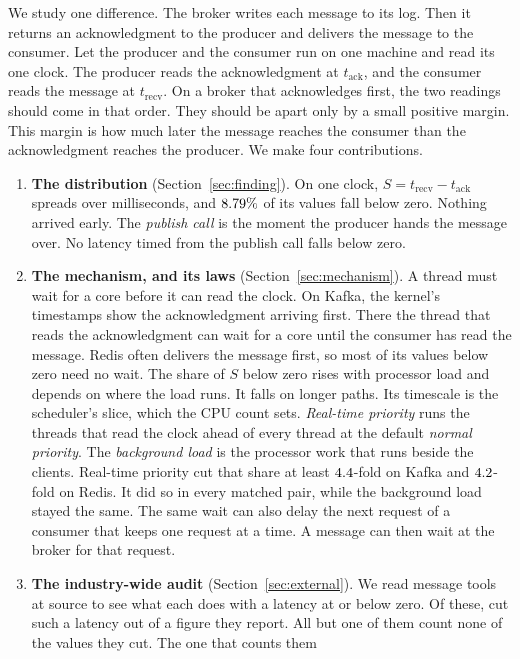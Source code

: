 \documentclass[10pt,journal,compsoc]{IEEEtran}
\newcommand{\kafka}{Kafka}
\newcommand{\redis}{Redis}
\begin{document}
We study one difference. The broker writes each message to its log. Then it returns an
acknowledgment to the producer and delivers the message to the consumer. Let the producer and the
consumer run on one machine and read its one clock. The producer reads the acknowledgment at
$t_{\mathrm{ack}}$, and the consumer reads the message at $t_{\mathrm{recv}}$. On a broker that
acknowledges first, the two readings should come in that order. They should be apart only by a
small positive margin. This margin is how much later the message reaches the consumer than the
acknowledgment reaches the producer.
We make four contributions.
\begin{enumerate}
\item \textbf{The distribution} (Section~\ref{sec:finding}). On one clock,
$S = t_{\mathrm{recv}} - t_{\mathrm{ack}}$ spreads over milliseconds, and $8.79\%$ of its
values fall below zero. Nothing arrived early. The \emph{publish call} is the moment the producer
hands the message over. No latency timed from the publish call falls below zero.
\item \textbf{The mechanism, and its laws} (Section~\ref{sec:mechanism}). A thread must wait for a
core before it can read the clock. On \kafka{}, the kernel's timestamps show the acknowledgment
arriving first. There the thread that reads the acknowledgment can wait for a core until the
consumer has read the message. \redis{} often delivers the message first, so most of its values
below zero need no wait. The share of $S$ below zero rises with processor load and depends on
where the load runs. It falls on longer paths. Its timescale is the scheduler's slice, which the
CPU count sets. \emph{Real-time priority} runs the threads that read the clock ahead of every
thread at the default \emph{normal priority}. The \emph{background load} is the processor work that
runs beside the clients. Real-time priority cut that share at least
$4.4$-fold on \kafka{} and $4.2$-fold on \redis{}. It did so in every
matched pair, while the background load stayed the same. The same wait can also delay the next request of a
consumer that keeps one request at a time. A message can then wait at the broker for that request.
\item \textbf{The industry-wide audit} (Section~\ref{sec:external}). We read \harnessMessageWord{}
message tools at source to see what each does with a latency at or below zero. Of these,
\harnessMessageCutAllWord{} cut such a latency out of a figure they report. All but one of them
count none of the values they cut. The one that counts them

\end{enumerate}
\end{document}
